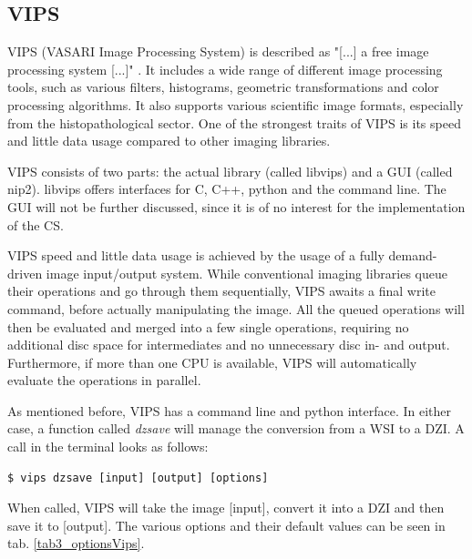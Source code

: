 \subsection{VIPS}

VIPS (VASARI Image Processing System) is described as "[...] a free image processing system [...]" \cite{web:vips}. It includes a wide range of different image processing tools, such as various filters, histograms, geometric transformations and color processing algorithms. It also supports various scientific image formats, especially from the histopathological sector\cite{web:vips}. One of the strongest traits of VIPS is its speed and little data usage compared to other imaging libraries\cite{cupitt05}.

VIPS consists of two parts: the actual library (called libvips) and a GUI (called nip2). libvips offers interfaces for C, C++, python and the command line. The GUI will not be further discussed, since it is of no interest for the implementation of the CS. 

VIPS speed and little data usage is achieved by the usage of a fully demand-driven image input/output system. While conventional imaging libraries queue their operations and go through them sequentially, VIPS awaits a final write command, before actually manipulating the image. All the queued operations will then be evaluated and merged into a few single operations, requiring no additional disc space for intermediates and no unnecessary disc in- and output. Furthermore, if more than one CPU is available, VIPS will automatically evaluate the operations in parallel\cite{cupitt96}.

As mentioned before, VIPS has a command line and python interface. In either case, a function called \emph{dzsave} will manage the conversion from a WSI to a DZI. A call in the terminal looks as follows:

\begin{lstlisting}
$ vips dzsave [input] [output] [options]
\end{lstlisting}

When called, VIPS will take the image [input], convert it into a DZI and then save it to [output]. The various options and their default values can be seen in tab. \ref{tab3_optionsVips}.

